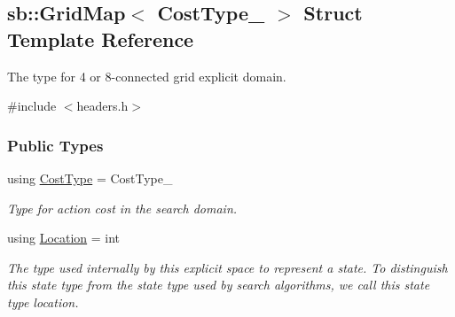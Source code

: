 \hypertarget{structsb_1_1GridMap}{}\subsection{sb\+:\+:Grid\+Map$<$ Cost\+Type\+\_\+ $>$ Struct Template Reference}
\label{structsb_1_1GridMap}


The type for 4 or 8-\/connected grid explicit domain.  




{\ttfamily \#include $<$headers.\+h$>$}

\subsubsection*{Public Types}
\begin{DoxyCompactItemize}
\item 
using \hyperlink{structsb_1_1GridMap_a9121a2d39b061441b297927937e87083}{Cost\+Type} = Cost\+Type\+\_\+\hypertarget{structsb_1_1GridMap_a9121a2d39b061441b297927937e87083}{}\label{structsb_1_1GridMap_a9121a2d39b061441b297927937e87083}

\begin{DoxyCompactList}\small\item\em Type for action cost in the search domain. \end{DoxyCompactList}\item 
using \hyperlink{structsb_1_1GridMap_aae073ca1668a117e37279473fff789d1}{Location} = int\hypertarget{structsb_1_1GridMap_aae073ca1668a117e37279473fff789d1}{}\label{structsb_1_1GridMap_aae073ca1668a117e37279473fff789d1}

\begin{DoxyCompactList}\small\item\em The type used internally by this explicit space to represent a state. To distinguish this state type from the state type used by search algorithms, we call this state type {\ttfamily location}. \end{DoxyCompactList}\end{DoxyCompactItemize}
